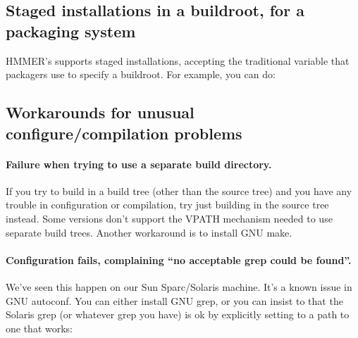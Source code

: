   \vspace{1ex}
  \vspace{1ex}


\subsection{Staged installations in a buildroot, for a packaging system}

HMMER's  supports staged installations, accepting
the traditional  variable that packagers use to specify
a buildroot. For example, you can do:

  \vspace{1ex}
  \vspace{1ex}




\subsection{Workarounds for unusual configure/compilation problems}

\paragraph{Failure when trying to use a
  separate build directory.}  If you try to build in a build tree
(other than the source tree) and you have any trouble in configuration
or compilation, try just building in the source tree instead. Some
 versions don't support the VPATH mechanism needed to use
separate build trees. Another workaround is to install GNU make.


\paragraph{Configuration fails, complaining ``no acceptable grep could
  be found''.} We've seen this happen on our Sun Sparc/Solaris
machine. It's a known issue in GNU autoconf. You can either install
GNU grep, or you can insist to  that the Solaris
grep (or whatever grep you have) is ok by explicitly setting
 to a path to one that works:

  \vspace{1ex}
  \vspace{1ex}

